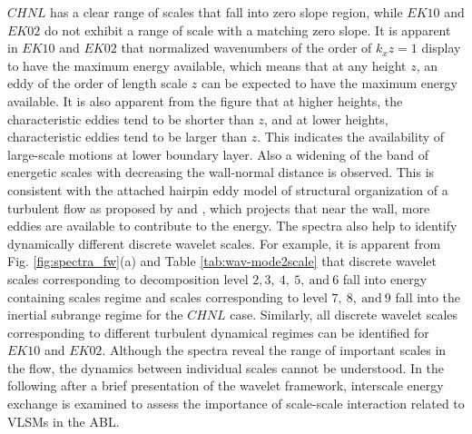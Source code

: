 $CHNL$ has a clear range of scales that fall into zero slope region, while $EK10$ and $EK02$ do not exhibit a range of scale with a matching zero slope. It is apparent in $EK10$ and $EK02$ that normalized wavenumbers of the order of $k_xz=1$ display to have the maximum energy available, which means that at any height $z$, an eddy of the order of length scale $z$ can be expected to have the maximum energy available. It is also apparent from the figure that at higher heights, the characteristic eddies tend to be shorter than $z$, and at lower heights, characteristic eddies tend to be larger than $z$. This indicates the availability of large-scale motions at lower boundary layer. Also a widening of the band of energetic scales with decreasing the wall-normal distance is observed. This is consistent with the attached hairpin eddy model of structural organization of a turbulent flow as proposed by \citet{perry_chng_jfm_86} and \citet{nickels_marusic_jfm_2001}, which projects that near the wall, more eddies are available to contribute to the energy. The spectra also help to identify dynamically different discrete wavelet scales. For example, it is apparent from Fig. \ref{fig:spectra_fw}(a) and Table \ref{tab:wav-mode2scale} that discrete wavelet scales corresponding to decomposition level $2, 3,\ 4,\ 5, \ \text{and} \ 6$ fall into energy containing scales regime and scales corresponding to level $7,\ 8, \ \text{and} \ 9 $ fall into the inertial subrange regime for the $CHNL$ case. Similarly, all discrete wavelet scales corresponding to different turbulent dynamical regimes can be identified for $EK10$ and $EK02$. Although the spectra reveal the range of important scales in the flow, the dynamics between individual scales cannot be understood. In the following after a brief presentation of the wavelet framework, interscale energy exchange is examined to assess the importance of scale-scale interaction related to VLSMs in the ABL. 

